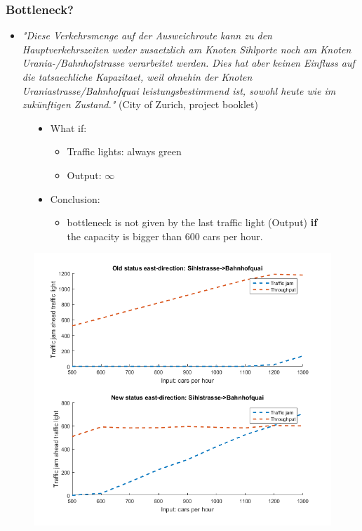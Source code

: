\documentclass[9pt]{beamer}
\begin{document}
\begin{frame}
\frametitle{Bottleneck?}
\begin{itemize}
\item \textit{"Diese Verkehrsmenge auf der Ausweichroute kann zu den Hauptverkehrszeiten weder zusaetzlich am Knoten Sihlporte noch am Knoten Urania-/Bahnhofstrasse verarbeitet werden. Dies hat aber keinen Einfluss auf die tatsaechliche Kapazitaet, weil ohnehin der Knoten Uraniastrasse/Bahnhofquai leistungsbestimmend ist, sowohl heute wie im zukünftigen Zustand."} (City of Zurich, project booklet)
\end{itemize}

\begin{figure}[H]
\begin{minipage}[t]{.5\textwidth}
\begin{itemize}
\item What if:
\begin{itemize}
\item Traffic lights: always green
\item Output: $\infty$
\end{itemize}
\vspace{1cm}
\item Conclusion:
\begin{itemize}
\item bottleneck is not given by the last traffic light (Output) \textbf{if} the capacity is bigger than 600 cars per hour.

\end{itemize}
\end{itemize}

\end{minipage}\hfill
\begin{minipage}[t]{.5\textwidth}
	\centering
	\vspace{0pt}
\includegraphics[width=\textwidth]{max_throughput2.png}
\end{minipage}\hfill
\end{figure}

\end{frame}
\end{document}
